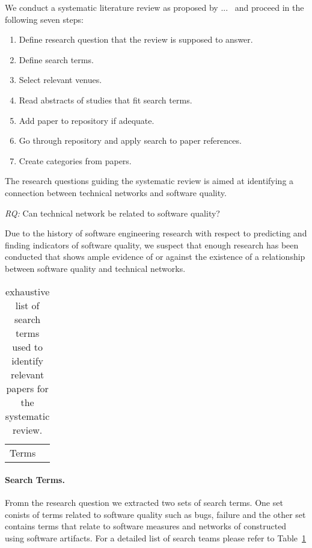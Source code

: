 We conduct a systematic literature review as proposed by ...~\cite{} and proceed in the following seven steps:

\begin{enumerate}
\item Define research question that the review is supposed to answer.
\item Define search terms.
\item Select relevant venues.
\item Read abstracts of studies that fit search terms.
\item Add paper to repository if adequate.
\item Go through repository and apply search to paper references.
\item Create categories from papers.
\end{enumerate}

The research questions guiding the systematic review is aimed at identifying a connection between technical networks and software quality.

\begin{note}
\emph{RQ:} Can technical network be related to software quality? 
\end{note}

Due to the history of software engineering research with respect to predicting and finding indicators of software quality, we suspect that enough research has been conducted that shows ample evidence of or against the existence of a relationship between software quality and technical networks.

\begin{table}
\centering
\begin{tabular}{ll}
Terms & \\
\end{tabular}
\label{chap:6:terms}
\caption{exhaustive list of search terms used to identify relevant papers for the systematic review.}
\end{table}

\paragraph{Search Terms.} Fromn the research question we extracted two sets of search terms.
One set conists of terms related to software quality such as bugs, failure and the other set contains terms that relate to software measures and networks of constructed using software artifacts.
For a detailed list of search teams please refer to Table~\ref{chap:6:terms}

